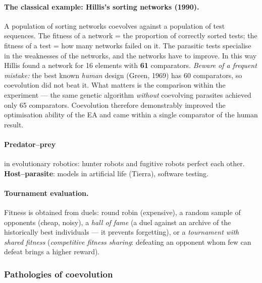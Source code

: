 \documentclass[11pt,a4paper]{article}
\theoremstyle{definition}
\begin{document}
\paragraph{The classical example: Hillis's sorting networks (1990).} A
population of sorting networks coevolves against a population of test sequences.
The fitness of a network = the proportion of correctly sorted tests; the fitness
of a test = how many networks failed on it. The parasitic tests specialise in
the weaknesses of the networks, and the networks have to improve. In this way
Hillis found a network for 16 elements with \textbf{61} comparators.
\emph{Beware of a frequent mistake:} the best known \emph{human} design (Green,
1969) has 60 comparators, so coevolution did not beat it. What matters is the
comparison within the experiment --- the same genetic algorithm \emph{without}
coevolving parasites achieved only 65 comparators. Coevolution therefore
demonstrably improved the optimisation ability of the EA and came within a
single comparator of the human result.

\paragraph{Predator--prey} in evolutionary robotics: hunter robots and fugitive
robots perfect each other. \textbf{Host--parasite}: models in artificial life
(Tierra), software testing.

\paragraph{Tournament evaluation.} Fitness is obtained from duels: round robin
(expensive), a random sample of opponents (cheap, noisy), a \emph{hall of fame}
(a duel against an archive of the historically best individuals --- it prevents
forgetting), or a \emph{tournament with shared fitness} (\emph{competitive
fitness sharing}: defeating an opponent whom few can defeat brings a higher
reward).

\subsubsection{Pathologies of coevolution}
\end{document}
